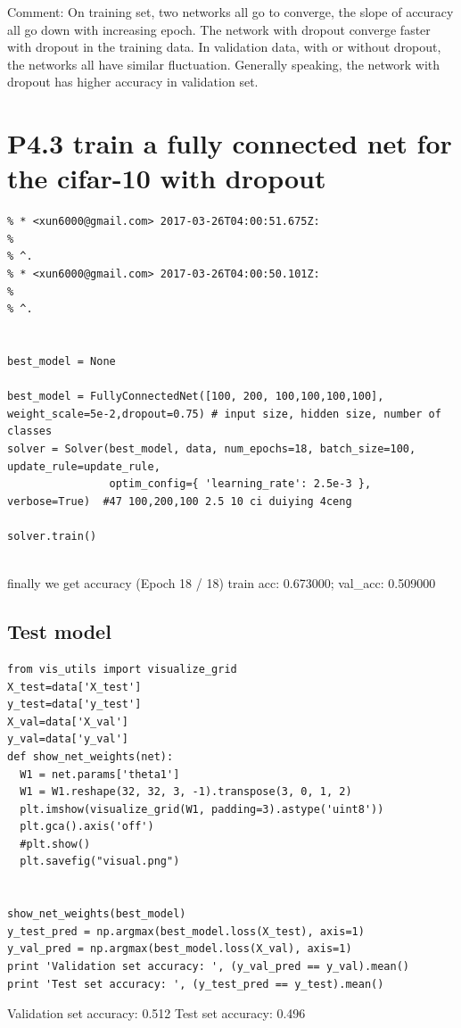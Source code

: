 \documentclass[12pt]{article}
\begin{document}
Comment:
On training set, two networks all go to converge, the slope of accuracy all go down with increasing epoch.
The network with dropout converge faster with dropout in the training data. In validation data, with or without dropout, the networks all have similar fluctuation. Generally speaking, the network with dropout has higher accuracy in validation set.

\section*{P4.3 train a fully connected net for the cifar-10 with dropout}
\begin{lstlisting}
% * <xun6000@gmail.com> 2017-03-26T04:00:51.675Z:
%
% ^.
% * <xun6000@gmail.com> 2017-03-26T04:00:50.101Z:
%
% ^.


best_model = None

best_model = FullyConnectedNet([100, 200, 100,100,100,100], weight_scale=5e-2,dropout=0.75) # input size, hidden size, number of classes 
solver = Solver(best_model, data, num_epochs=18, batch_size=100, update_rule=update_rule, 
                optim_config={ 'learning_rate': 2.5e-3 }, verbose=True)  #47 100,200,100 2.5 10 ci duiying 4ceng 

solver.train()


\end{lstlisting}
finally we get accuracy 
(Epoch 18 / 18) train acc: 0.673000; val\_acc: 0.509000
\subsection*{Test model}
\begin{lstlisting}
from vis_utils import visualize_grid
X_test=data['X_test']
y_test=data['y_test']
X_val=data['X_val']
y_val=data['y_val']
def show_net_weights(net):
  W1 = net.params['theta1']
  W1 = W1.reshape(32, 32, 3, -1).transpose(3, 0, 1, 2)
  plt.imshow(visualize_grid(W1, padding=3).astype('uint8'))
  plt.gca().axis('off')
  #plt.show()
  plt.savefig("visual.png")


show_net_weights(best_model)
y_test_pred = np.argmax(best_model.loss(X_test), axis=1)
y_val_pred = np.argmax(best_model.loss(X_val), axis=1)
print 'Validation set accuracy: ', (y_val_pred == y_val).mean()
print 'Test set accuracy: ', (y_test_pred == y_test).mean()
\end{lstlisting}

Validation set accuracy:  0.512
Test set accuracy:  0.496
\end{document}
